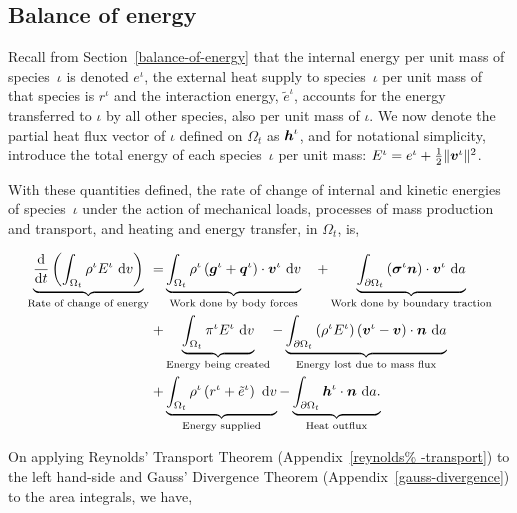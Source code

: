 \subsection{Balance of energy}
\label{eu-balance-of-energy}

Recall from Section~\ref{balance-of-energy} that the internal energy
per unit mass of species~$\iota$ is denoted $e^\iota$, the external
heat supply to species~$\iota$ per unit mass of that species is
$r^\iota$ and the interaction energy, $\tilde{e}^\iota$, accounts for
the energy transferred to $\iota$ by all other species, also per unit
mass of $\iota$. We now denote the partial heat flux vector of $\iota$
defined on $\Omega_{t}$ as $\mbox{\boldmath$ h$}^\iota$, and for notational simplicity,
introduce the total energy of each species~$\iota$ per unit mass:
$E^{\iota} = e^\iota + \frac{1}{2} \Vert\mbox{\boldmath$ v$}^\iota\Vert^2$.

With these quantities defined, the rate of change of internal and
kinetic energies of species~$\iota$ under the action of mechanical
loads, processes of mass production and transport, and heating and
energy transfer, in $\Omega_{t}$, is,

\begin{equation}
\begin{split}
\underbrace{\frac{\mathrm{d}}{\mathrm{d}t}\left(\int_{\Omega_{t}}
  \rho^{\iota} E^{\iota}\ \mathrm{d}v \right)}_{\text{Rate of change
    of energy}} = & \underbrace{\int_{\Omega_{t}} \rho^{\iota}
  \left(\mbox{\boldmath$ g$}^{\iota} +
  \mbox{\boldmath$ q$}^{\iota}\right)\cdot\mbox{\boldmath$ v$}^{\iota}\ \mathrm{d}v}_{\text{Work done by
    body forces}}\quad + \underbrace{\int_{\partial \Omega_{t}}
  \left(\mbox{\boldmath$\sigma$}^{\iota}\mbox{\boldmath$ n$}\right)
  \cdot\mbox{\boldmath$ v$}^{\iota}\ \mathrm{d}a}_{\text{Work done by boundary
    traction}}\\ + & \underbrace{\int_{\Omega_{t}}
  \pi^{\iota}E^{\iota}\ \mathrm{d}v}_{\text{Energy being created}} -
\underbrace{\int_{\partial \Omega_{t}} \left(\rho^{\iota} E^{\iota}
  \right) \left(\mbox{\boldmath$ v$}^{\iota} - \mbox{\boldmath$ v$}\right) \cdot
  \mbox{\boldmath$ n$}\ \mathrm{d}a}_{\text{Energy lost due to mass flux}} \\ +
&\underbrace{\int_{\Omega_{t}} \rho^{\iota} \left(r^{\iota} +
  \tilde{e}^{\iota} \right)\ \mathrm{d}v}_{\text{Energy supplied}} -
\underbrace{\int_{\partial \Omega_{t}}
  \mbox{\boldmath$ h$}^{\iota}\cdot\mbox{\boldmath$ n$}\ \mathrm{d}a.}_{\text{Heat outflux}}
\end{split}
\label{eu-globalbalanceofenergy}
\end{equation}

On applying Reynolds' Transport Theorem (Appendix~\ref{reynolds%
  -transport}) to the left hand-side and Gauss' Divergence Theorem
(Appendix~\ref{gauss-divergence}) to the area integrals, we have,

